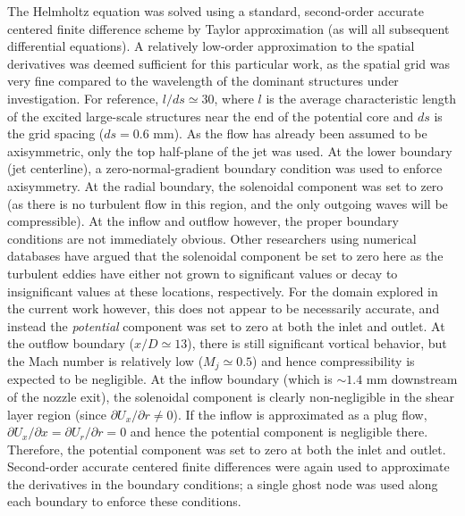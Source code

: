 The Helmholtz equation was solved using a standard, second-order accurate centered finite difference scheme by Taylor approximation (as will all subsequent differential equations).
A relatively low-order approximation to the spatial derivatives was deemed sufficient for this particular work, as the spatial grid was very fine compared to the wavelength of the dominant structures under investigation.
For reference, $l/ds \simeq 30$, where $l$ is the average characteristic length of the excited large-scale structures near the end of the potential core and $ds$ is the grid spacing ($ds = 0.6$ mm).
As the flow has already been assumed to be axisymmetric, only the top half-plane of the jet was used.
At the lower boundary (jet centerline), a zero-normal-gradient boundary condition was used to enforce axisymmetry.
At the radial boundary, the solenoidal component was set to zero (as there is no turbulent flow in this region, and the only outgoing waves will be compressible).
At the inflow and outflow however, the proper boundary conditions are not immediately obvious.
Other researchers using numerical databases \citep{Unnikrishnan2015} have argued that the solenoidal component be set to zero here as the turbulent eddies have either not grown to significant values or decay to insignificant values at these locations, respectively.
For the domain explored in the current work however, this does not appear to be necessarily accurate, and instead the \textit{potential} component was set to zero at both the inlet and outlet.
At the outflow boundary ($x/D \simeq 13$), there is still significant vortical behavior, but the Mach number is relatively low ($M_j \simeq 0.5$) and hence compressibility is expected to be negligible.
At the inflow boundary (which is $\sim1.4$ mm downstream of the nozzle exit), the solenoidal component is clearly non-negligible in the shear layer region (since $\partial U_x / \partial r \neq 0$).
If the inflow is approximated as a plug flow, $\partial U_x / \partial x = \partial U_r / \partial r = 0$ and hence the potential component is negligible there.
Therefore, the potential component was set to zero at both the inlet and outlet.
Second-order accurate centered finite differences were again used to approximate the derivatives in the boundary conditions; a single ghost node was used along each boundary to enforce these conditions.

